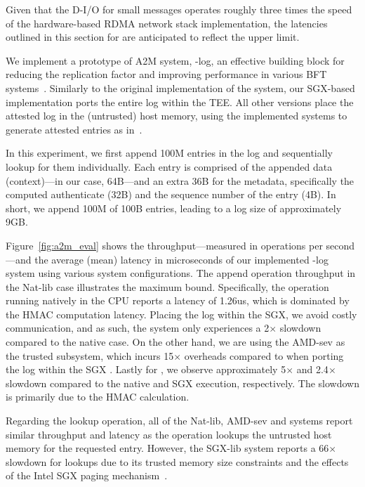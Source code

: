 Given that the D-I/O for small messages operates roughly three times the speed of the hardware-based RDMA network stack implementation, the latencies outlined in this section for \projecttitle{} are anticipated to reflect the upper limit.

 We implement a prototype of A2M system, \projecttitle{}-log, an effective building block for reducing the replication factor and improving performance in various BFT systems~\cite{A2M, sundr, Castro:2002, AbdElMalek2005FaultscalableBF}. Similarly to the original implementation of the system, our SGX-based implementation ports the entire log within the TEE. All other versions place the attested log in the (untrusted) host memory, using the implemented systems to generate attested entries as  in~\cite{levin2009trinc}. 

In this experiment, we first append 100M entries in the log and sequentially lookup for them individually. Each entry is comprised of the appended data (context)---in our case, 64B---and an extra 36B for the metadata, specifically the computed authenticate (32B) and the sequence number of the entry (4B). In short, we append 100M of 100B entries, leading to a log size of approximately 9GB. 

 Figure~\ref{fig:a2m_eval} shows the throughput---measured in operations per second---and the average (mean) latency in microseconds of our implemented \projecttitle{}-log system using various system configurations. The append operation throughput in the Nat-lib case illustrates the maximum bound. Specifically, the operation running natively in the CPU reports a latency of 1.26us, which is dominated by the HMAC computation latency.
Placing the log within the SGX, we avoid costly communication, and as such, the system only experiences a 2$\times$ slowdown compared to the native case. On the other hand, we are using the AMD-sev as the trusted subsystem, which incurs 15$\times$ overheads compared to when porting the log within the SGX . Lastly for \projecttitle{}, we observe approximately 5$\times$ and 2.4$\times$ slowdown compared to the native and SGX execution, respectively. The slowdown is primarily due to the HMAC calculation.

Regarding the lookup operation, all of the Nat-lib, AMD-sev and \projecttitle{} systems report similar throughput and latency as the operation lookups the untrusted host memory for the requested entry. However, the SGX-lib system reports a 66$\times$ slowdown for lookups due to its trusted memory size constraints and the effects of the Intel SGX paging mechanism~\cite{treaty}.



